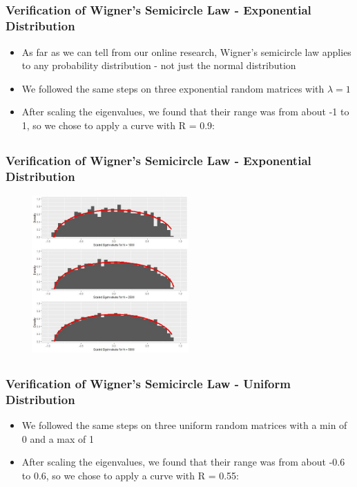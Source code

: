 \documentclass[handout, xcolor=dvipsnames]{beamer}
\begin{document}
\subsection{}
\begin{frame}
	\frametitle{Verification of Wigner's Semicircle Law - Exponential Distribution}
    \begin{itemize}
        \item As far as we can tell from our online research, Wigner's semicircle law applies to any probability distribution - not just the normal distribution
        \item We followed the same steps on three exponential random matrices with $\lambda=1$
        \item After scaling the eigenvalues, we found that their range was from about -1 to 1, so we chose to apply a curve with R = 0.9:
    \end{itemize}
\end{frame}


\subsection{}
\begin{frame}
	\frametitle{Verification of Wigner's Semicircle Law - Exponential Distribution}
        \begin{center}
            \includegraphics[width=8cm,height=6cm]{Figures/SemiLaw_Exp.jpeg}
        \end{center}
\end{frame}


\subsection{}
\begin{frame}
	\frametitle{Verification of Wigner's Semicircle Law - Uniform Distribution}
    \begin{itemize}
        \item We followed the same steps on three uniform random matrices with a min of 0 and a max of 1
        \item After scaling the eigenvalues, we found that their range was from about -0.6 to 0.6, so we chose to apply a curve with R = 0.55:
    \end{itemize}
\end{frame}
\end{document}
